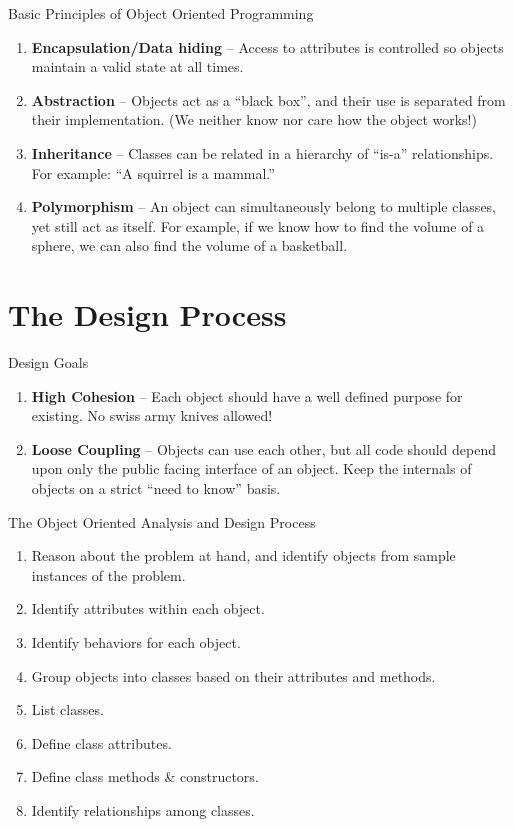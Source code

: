 \documentclass[]{beamer}
\begin{document}
\begin{frame}{Basic Principles of Object Oriented Programming}
    \begin{enumerate}[<+->]
        \item \textbf{Encapsulation/Data hiding} -- Access to attributes is
            controlled so objects maintain a valid state at all times.
        \item \textbf{Abstraction} -- Objects act as a ``black box'',
            and their use is separated from their implementation.
            (We neither know nor care how the object works!)
        \item \textbf{Inheritance} -- Classes can be related in
            a hierarchy of ``is-a'' relationships. For example: ``A
            squirrel is a mammal.''
        \item \textbf{Polymorphism} -- An object can simultaneously
            belong to multiple classes, yet still act as itself.  For
            example, if we know how to find the volume of a sphere, we
            can also find the volume of a basketball.
    \end{enumerate}
\end{frame}

\section{The Design Process}
\begin{frame}{Design Goals}
    \begin{enumerate}[<+->]
        \item \textbf{High Cohesion} -- Each object should have a well
            defined purpose for existing. No swiss army knives
            allowed!

        \item \textbf{Loose Coupling} -- Objects can use each other,
            but all code should depend upon only the public facing
            interface of an object.  Keep the internals of objects on
            a strict ``need to know'' basis.
    \end{enumerate}
\end{frame}

\begin{frame}{The Object Oriented Analysis and Design Process}
    \begin{enumerate}[<+->]
        \item Reason about the problem at hand, and identify objects
            from sample instances of the problem.
        \item Identify attributes within each object.
        \item Identify behaviors for each object.
        \item Group objects into classes based on their attributes and
            methods.
        \item List classes.
        \item Define class attributes.
        \item Define class methods \& constructors.
        \item Identify relationships among classes.
    \end{enumerate}
\end{frame}
\end{document}
